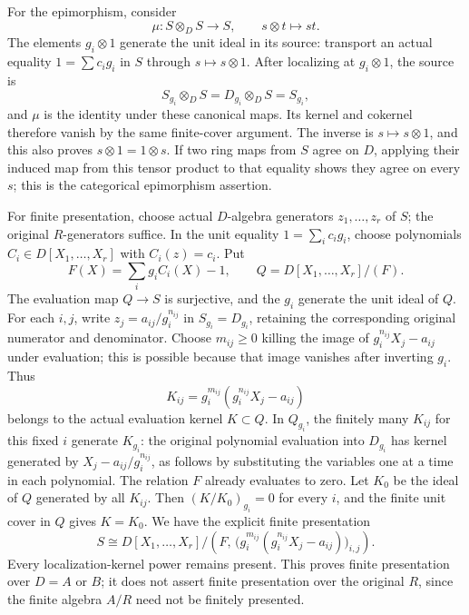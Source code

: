 For the epimorphism, consider \[
 \mu:S\otimes_D S\longrightarrow S,\qquad s\otimes t\longmapsto st.
\] The elements \(g_i\otimes1\) generate the unit ideal in its source: transport an actual equality \(1=\sum c_i g_i\) in \(S\) through \(s\mapsto s\otimes1\). After localizing at \(g_i\otimes1\), the source is \[
 S_{g_i}\otimes_D S=D_{g_i}\otimes_D S=S_{g_i},
\] and \(\mu\) is the identity under these canonical maps. Its kernel and cokernel therefore vanish by the same finite-cover argument. The inverse is \(s\mapsto s\otimes1\), and this also proves \(s\otimes1=1\otimes s\). If two ring maps from \(S\) agree on \(D\), applying their induced map from this tensor product to that equality shows they agree on every \(s\); this is the categorical epimorphism assertion.

For finite presentation, choose actual \(D\)-algebra generators \(z_1,\ldots,z_r\) of \(S\); the original \(R\)-generators suffice. In the unit equality \(1=\sum_i c_i g_i\), choose polynomials \(C_i\in D[X_1,\ldots,X_r]\) with \(C_i(z)=c_i\). Put \[
 F(X)=\sum_i g_i C_i(X)-1,\qquad
 Q=D[X_1,\ldots,X_r]/(F).
\] The evaluation map \(Q\to S\) is surjective, and the \(g_i\) generate the unit ideal of \(Q\). For each \(i,j\), write \(z_j=a_{ij}/g_i^{n_{ij}}\) in \(S_{g_i}=D_{g_i}\), retaining the corresponding original numerator and denominator. Choose \(m_{ij}\geq0\) killing the image of \(g_i^{n_{ij}}X_j-a_{ij}\) under evaluation; this is possible because that image vanishes after inverting \(g_i\). Thus \[
 K_{ij}=g_i^{m_{ij}}(g_i^{n_{ij}}X_j-a_{ij})
\] belongs to the actual evaluation kernel \(K\subset Q\). In \(Q_{g_i}\), the finitely many \(K_{ij}\) for this fixed \(i\) generate \(K_{g_i}\): the original polynomial evaluation into \(D_{g_i}\) has kernel generated by \(X_j-a_{ij}/g_i^{n_{ij}}\), as follows by substituting the variables one at a time in each polynomial. The relation \(F\) already evaluates to zero. Let \(K_0\) be the ideal of \(Q\) generated by all \(K_{ij}\). Then \((K/K_0)_{g_i}=0\) for every \(i\), and the finite unit cover in \(Q\) gives \(K=K_0\). We have the explicit finite presentation \[
 S\cong
 D[X_1,\ldots,X_r]\big/
 \left(F,\,
       \bigl(g_i^{m_{ij}}
             (g_i^{n_{ij}}X_j-a_{ij})\bigr)_{i,j}\right).
\] Every localization-kernel power remains present. This proves finite presentation over \(D=A\) or \(B\); it does not assert finite presentation over the original \(R\), since the finite algebra \(A/R\) need not be finitely presented.

